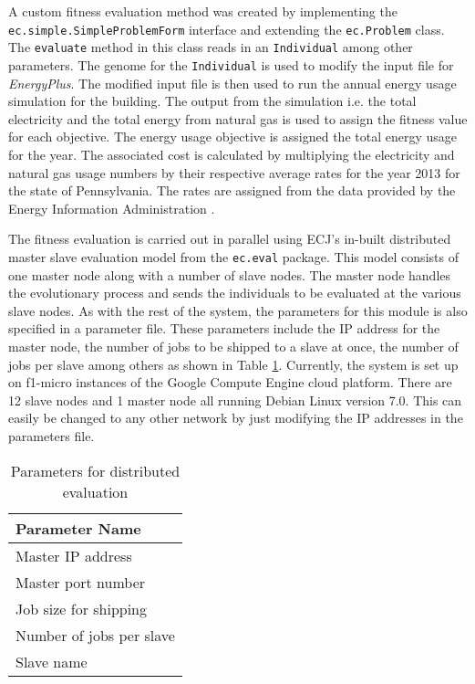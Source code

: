 A custom fitness evaluation method was created by implementing the \\
\texttt{ec.simple.SimpleProblemForm} interface and extending the \texttt{ec.Problem} class. The \texttt{evaluate} method in this class reads in an \texttt{Individual} among other parameters. The genome for the \texttt{Individual} is used to modify the input file for \textit{EnergyPlus}. The modified input file is then used to run the annual energy usage simulation for the building. The output from the simulation i.e. the total electricity and the total energy from natural gas is used to assign the fitness value for each objective. The energy usage objective is assigned the total energy usage for the year. The associated cost is calculated by multiplying the electricity and natural gas usage numbers by their respective average rates for the year 2013 for the state of Pennsylvania. The rates are assigned from the data provided by the Energy Information Administration \cite{eia}. 

The fitness evaluation is carried out in parallel using ECJ's in-built distributed master slave evaluation model from the \texttt{ec.eval} package. This model consists of one master node along with a number of slave nodes. The master node handles the evolutionary process and sends the individuals to be evaluated at the various slave nodes. As with the rest of the system, the parameters for this module is also specified in a parameter file. These parameters include the IP address for the master node, the number of jobs to be shipped to a slave at once, the number of jobs per slave among others as shown in Table \ref{table:dist_param}. Currently, the system is set up on f1-micro instances of the Google Compute Engine cloud platform. There are 12 slave nodes and 1 master node all running Debian Linux version 7.0. This can easily be changed to any other network by just modifying the IP addresses in the parameters file.

\begin{table}[htbp]
    \centering
    \begin{tabular}{|l|}
    \hline
    Parameter Name                  \\ \hline
    Master IP address               \\
    Master port number               \\
    Job size for shipping             \\
    Number of jobs per slave           \\
    Slave name              \\ \hline
    \end{tabular}
    \caption{Parameters for distributed evaluation}
    \label{table:dist_param}
\end{table}


